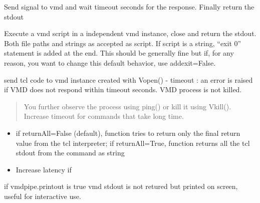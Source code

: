 \documentclass[letterpaper,10pt,english]{sphinxmanual}
\begin{document}

\begin{fulllineitems}
\label{vmdpipe:vmdpipe.isVMDopen}
\end{fulllineitems}


\begin{fulllineitems}
\label{vmdpipe:vmdpipe.ping}
Send signal to vmd and wait timeout seconds for the response. Finally return the stdout

\end{fulllineitems}


\begin{fulllineitems}
\label{vmdpipe:vmdpipe.runAndReturn}
Execute a vmd script in a independent vmd instance, close and return the stdout. 
Both file paths and strings as accepted as script. If script is a string, ``exit 0'' statement
is added at the end. This should be generally fine but if, for any reason, you want to
change this default behavior, use addexit=False.

\end{fulllineitems}


\begin{fulllineitems}
\label{vmdpipe:vmdpipe.send_string}
send tcl code to vmd instance created with Vopen()
- timeout : an error is raised if VMD does not respond within timeout seconds. VMD process is not killed.
\begin{quote}

You further observe the process using ping() or kill it using Vkill(). Increase timeout for commands that take long time.
\end{quote}
\begin{itemize}
\item {} 
if returnAll=False (default), function tries to return only the final return value from the tcl interpreter;
if returnAll=True, function returns all the tcl stdout from the command as string

\item {} 
Increase latency if

\end{itemize}

if vmdpipe.printout is true vmd stdout is not retured but printed on screen, 
useful for interactive use.

\end{fulllineitems}
\end{document}
